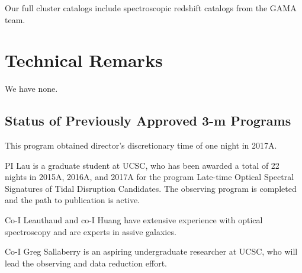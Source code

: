 \documentclass[letterpaper,12pt,dvips]{article}
\begin{document}
Our full cluster catalogs include spectroscopic redshift catalogs from the GAMA team. 

\section{Technical Remarks}

We have none. 

\subsection{Status of Previously Approved 3-m Programs}

This program obtained director's discretionary time of one night in 2017A. 

PI Lau is a graduate student at UCSC, who has been awarded a total of 22 nights in 2015A, 2016A, 
and 2017A for the program Late-time Optical Spectral Signatures of Tidal Disruption Candidates. 
The observing program is completed and the path to publication is active. 

Co-I Leauthaud and co-I Huang have extensive experience with optical spectroscopy and are experts 
in assive galaxies. 

Co-I Greg Sallaberry is an aspiring undergraduate researcher at UCSC, who will lead the observing 
and data reduction effort. 
\end{document}
